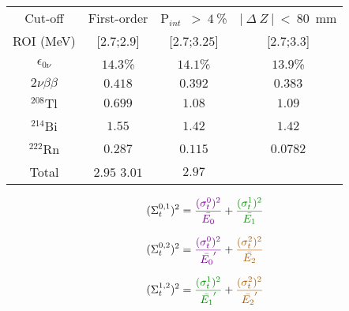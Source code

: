 \documentclass[a4paper,17pt, twoside]{memoir}   	%
\newcommand{\twonu}{2\nu\beta\beta}
\newcommand{\Tl}{$^{208}$Tl}
\newcommand{\Bi}{$^{214}$Bi}
\newcommand{\Rn}{$^{222}$Rn}
\newcommand{\Pint}{P$_{int}$}
\begin{document}
\begin{table}
  \begin{tabular}{|c|c|c|c|}
    \hline
    Cut-off & First-order & \Pint~$>~4~$\% & $|~\Delta~Z~|~<~80$~mm  \\
    ROI (MeV) & [$2.7$;$2.9$] & [$2.7$;$3.25$] & [$2.7$;$3.3$] \\
    \hline\hline
    $\epsilon_{0\nu}$ & $14.3$\% & $14.1$\% & $13.9$\% \\
    \hdashline
    $\twonu$ & $0.418$ & $0.392$ & $0.383$ \\
    \Tl  & $0.699$ & $1.08$ & $1.09$ \\
    \Bi  & $1.55$ & $1.42$ & $1.42$ \\
    \Rn  & $0.287$ & $0.115$ & $0.0782$ \\
    Total  & $2.95$ $3.01$ & $2.97$ \\
    \hline
  \end{tabular}
\end{table}


\begin{equation}
  (\Sigma_{t}^{0,1})^{2} = \textcolor{blue!55!red}{\frac{(\sigma_{t}^{0})^{2}}{\bar{E_{0}}}} + \textcolor{green!55!black}{\frac{(\sigma_{t}^{1})^{2}}{\bar{E_{1}}}}
\end{equation}

\begin{equation}
  (\Sigma_{t}^{0,2})^{2} = \textcolor{blue!55!red}{\frac{(\sigma_{t}^{0})^{2}}{\bar{E_{0}}'}} + \textcolor{red!65!green}{\frac{(\sigma_{t}^{2})^{2}}{\bar{E_{2}}}}
\end{equation}

\begin{equation}
  (\Sigma_{t}^{1,2})^{2} = \textcolor{green!55!black}{\frac{(\sigma_{t}^{1})^{2}}{\bar{E_{1}}'}} + \textcolor{red!65!green}{\frac{(\sigma_{t}^{2})^{2}}{\bar{E_{2}}'}}
\end{equation}
\end{document}
